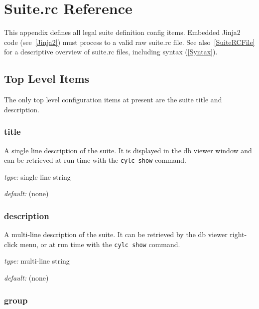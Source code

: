 \section{Suite.rc Reference}
\label{SuiteRCReference}

\lstset{language=bash}

This appendix defines all legal suite definition config items.
Embedded Jinja2 code (see~\ref{Jinja2}) must process to a valid
raw suite.rc file. See also~\ref{SuiteRCFile} for a descriptive
overview of suite.rc files, including syntax (\ref{Syntax}).

\subsection{Top Level Items}

The only top level configuration items at present are the suite title
and description.

\subsubsection{title}

A single line description of the suite. It is displayed in the db viewer
window and can be retrieved at run time with the
\lstinline=cylc show= command.

\begin{myitemize}
\item {\em type:} single line string
\item {\em default:} (none)
\end{myitemize}

\subsubsection{description}

A multi-line description of the suite. It can be retrieved by the db viewer
right-click menu, or at run time with the \lstinline=cylc show= command.

\begin{myitemize}
\item {\em type:} multi-line string
\item {\em default:} (none)
\end{myitemize}

\subsubsection{group}

